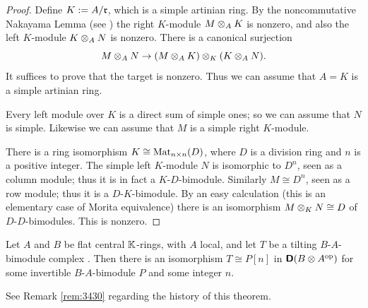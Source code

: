 \begin{proof}
Define $K := A / \mathfrak{r}$, which is a simple artinian ring. By the noncommutative 
Nakayama Lemma (see \cite[Proposition 2.5.24]{Row}) the right $K$-module 
$M \otimes_A K$ is nonzero, and also the left $K$-module $K \otimes_A N$ is nonzero.
There is a canonical surjection 
\[ M \otimes_A N \to (M \otimes_A K) \otimes_K (K \otimes_A N) . \]
It suffices to prove that the target is nonzero. Thus we can assume that 
$A = K$ is a simple artinian ring. 

Every left module over $K$ is a  direct sum of simple ones; so we can assume 
that $N$ is simple. Likewise we can assume that $M$ is a simple right 
$K$-module. 

There is a ring isomorphism $K \cong \operatorname{Mat}_{n \times n}(D)$, 
where $D$ is a division ring and $n$ is a positive integer. The simple left 
$K$-module $N$ is isomorphic to $D^n$, seen as a column module; thus it is in 
fact a $K$-$D$-bimodule. Similarly $M \cong D^n$, seen as a row module; thus it 
is a $D$-$K$-bimodule. By an easy calculation (this is an elementary case of 
Morita equivalence) there is an isomorphism 
$M \otimes_K N \cong D$ of $D$-$D$-bimodules. This is nonzero. 
\end{proof}

\begin{thm} \label{thm:3575}
Let $A$ and $B$ be flat central $\mathbb{K}$-rings, with $A$ local, and let 
$T$ be a tilting $B$-$A$-bimodule complex%
%
.
Then there is an iso\-morph\-ism $T \cong P[n]$
in $\boldsymbol{\mathsf{D}}(B \otimes A^{\mathrm{op}})$ for some 
invertible $B$-$A$-bimodule
$P$ and some integer $n$. 
\end{thm}

See Remark \ref{rem:3430} regarding the history of this theorem. 

